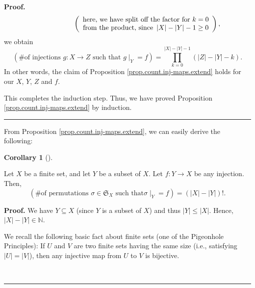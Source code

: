 \documentclass[numbers=enddot,12pt,final,onecolumn,notitlepage]{scrartcl}%
\numberwithin{exer}{section}
\theoremstyle{definition}
\newtheorem{coro}[theo]{Corollary}
\newenvironment{corollary}[1][]
{\begin{coro}[#1]\begin{leftbar}}
{\end{leftbar}\end{coro}}
\newenvironment{proof}[1][Proof]{\noindent\textbf{#1.} }{\ \rule{0.5em}{0.5em}}
\let\prodnonlimits\prod
\renewcommand{\prod}{\prodnonlimits\limits}
\newenvironment{verlong}{}{}
\begin{document}
\begin{verlong}
\begin{proof}
\begin{align*}
&  \ \ \ \ \ \ \ \ \ \ \ \ \ \ \ \ \ \ \ \ \left(
\begin{array}
[c]{c}%
\text{here, we have split off the factor for }k=0\\
\text{from the product, since }\left\vert X\right\vert -\left\vert
Y\right\vert -1\geq0
\end{array}
\right)  ,
\end{align*}
we obtain%
\[
\left(  \text{\# of injections }g:X\rightarrow Z\text{ such that }\left.
g\mid_{Y}\right.  =f\right)  =\prod_{k=0}^{\left\vert X\right\vert -\left\vert
Y\right\vert -1}\left(  \left\vert Z\right\vert -\left\vert Y\right\vert
-k\right)  .
\]
In other words, the claim of Proposition \ref{prop.count.inj-maps.extend}
holds for our $X$, $Y$, $Z$ and $f$.

This completes the induction step. Thus, we have proved Proposition
\ref{prop.count.inj-maps.extend} by induction.
\end{proof}

From Proposition \ref{prop.count.inj-maps.extend}, we can easily derive the following:

\begin{corollary}
\label{cor.count.bij-maps.extend}Let $X$ be a finite set, and let $Y$ be a
subset of $X$. Let $f:Y\rightarrow X$ be any injection. Then,%
\[
\left(  \text{\# of permutations }\sigma\in\mathfrak{S}_{X}\text{ such that
}\left.  \sigma\mid_{Y}\right.  =f\right)  =\left(  \left\vert X\right\vert
-\left\vert Y\right\vert \right)  !.
\]

\end{corollary}

\begin{proof}
We have $Y\subseteq X$ (since $Y$ is a subset of $X$) and thus $\left\vert
Y\right\vert \leq\left\vert X\right\vert $. Hence, $\left\vert X\right\vert
-\left\vert Y\right\vert \in\mathbb{N}$.

We recall the following basic fact about finite sets (one of the Pigeonhole
Principles): If $U$ and $V$ are two finite sets having the same size (i.e.,
satisfying $\left\vert U\right\vert =\left\vert V\right\vert $), then any
injective map from $U$ to $V$ is bijective.


\end{proof}
\end{verlong}
\end{document}
